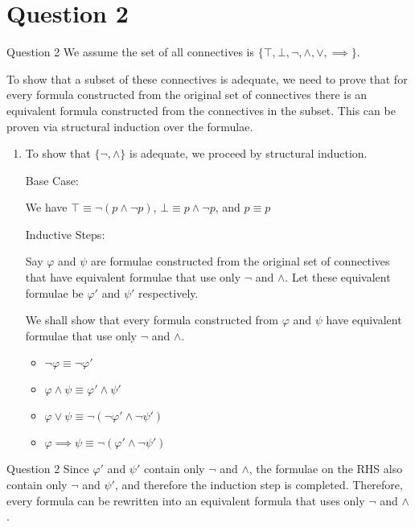 \documentclass{beamer}
\begin{document}
    \section{Question 2}
    {
        \begin{frame}{Question 2}
            \vspace*{-4pt}
            We assume the set of all connectives is $\{\top, \bot, \neg, \land, \lor, \implies\}$.

            To show that a subset of these connectives is adequate, we need to prove that for every formula constructed from the original set of connectives there is an equivalent formula constructed from the connectives in the subset. This can be proven via structural induction over the formulae.

            \begin{enumerate}
                \item To show that $\{\neg, \land\}$ is adequate, we proceed by structural induction.
                
                Base Case:

                We have $\top \equiv \neg (p \land \neg p)$, $\bot \equiv p \land \neg p$, and $p \equiv p$

                Inductive Steps:

                Say $\varphi$ and $\psi$ are formulae constructed from the original set of connectives that have equivalent formulae that use only $\neg$ and $\land$. Let these equivalent formulae be $\varphi'$ and $\psi'$ respectively. 
                
                We shall show that every formula constructed from $\varphi$ and $\psi$ have equivalent formulae that use only $\neg$ and $\land$.
                \begin{itemize}
                    \item $\neg \varphi \equiv \neg \varphi'$
                    \item $\varphi \land \psi \equiv \varphi' \land \psi'$
                    \item $\varphi \lor \psi \equiv \neg (\neg \varphi' \land \neg \psi')$
                    \item $\varphi \implies \psi \equiv \neg (\varphi' \land \neg \psi')$
                \end{itemize} 
            \end{enumerate}
        \end{frame}
        \begin{frame}{Question 2}
            Since $\varphi'$ and $\psi'$ contain only $\neg$ and $\land$, the formulae on the RHS also contain only $\neg$ and $\psi'$, and therefore the induction step is completed. Therefore, every formula can be rewritten into an equivalent formula that uses only $\neg$ and $\land$.


\end{frame}}
\end{document}
